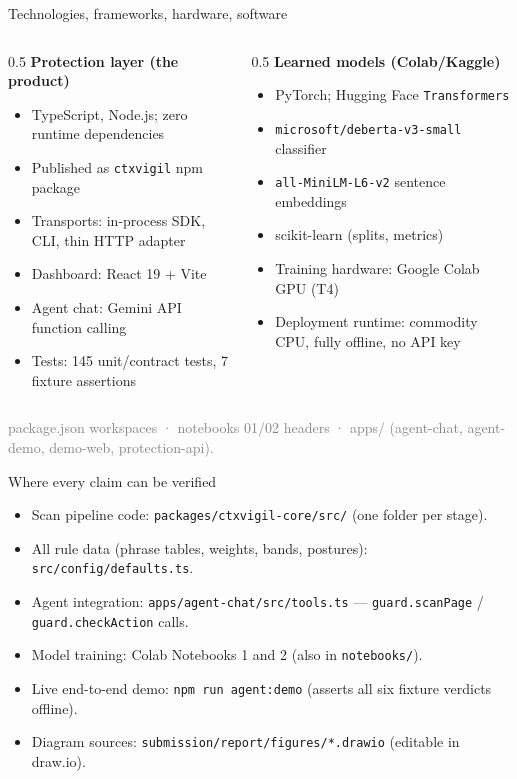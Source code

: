 \documentclass[aspectratio=169]{beamer}
\newcommand{\src}[1]{{\footnotesize\textcolor{gray}{#1}}}
\begin{document}
\begin{frame}{Technologies, frameworks, hardware, software}
\begin{columns}
\begin{column}{0.5\textwidth}
\textbf{Protection layer (the product)}
\begin{itemize}
  \item TypeScript, Node.js; zero runtime dependencies
  \item Published as \texttt{ctxvigil} npm package
  \item Transports: in-process SDK, CLI, thin HTTP adapter
  \item Dashboard: React 19 + Vite
  \item Agent chat: Gemini API function calling
  \item Tests: 145 unit/contract tests, 7 fixture assertions
\end{itemize}
\end{column}
\begin{column}{0.5\textwidth}
\textbf{Learned models (Colab/Kaggle)}
\begin{itemize}
  \item PyTorch; Hugging Face \texttt{Transformers}
  \item \texttt{microsoft/deberta-v3-small} classifier
  \item \texttt{all-MiniLM-L6-v2} sentence embeddings
  \item scikit-learn (splits, metrics)
  \item Training hardware: Google Colab GPU (T4)
  \item Deployment runtime: commodity CPU, fully offline, no API key
\end{itemize}
\end{column}
\end{columns}
\src{package.json workspaces · notebooks 01/02 headers · apps/ (agent-chat, agent-demo, demo-web, protection-api).}
\end{frame}

\begin{frame}{Where every claim can be verified}
\begin{itemize}
  \item Scan pipeline code: \texttt{packages/ctxvigil-core/src/} (one folder per stage).
  \item All rule data (phrase tables, weights, bands, postures): \texttt{src/config/defaults.ts}.
  \item Agent integration: \texttt{apps/agent-chat/src/tools.ts} --- \texttt{guard.scanPage} / \texttt{guard.checkAction} calls.
  \item Model training: Colab Notebooks 1 and 2 (also in \texttt{notebooks/}).
  \item Live end-to-end demo: \texttt{npm run agent:demo} (asserts all six fixture verdicts offline).
  \item Diagram sources: \texttt{submission/report/figures/*.drawio} (editable in draw.io).
\end{itemize}
\end{frame}
\end{document}
